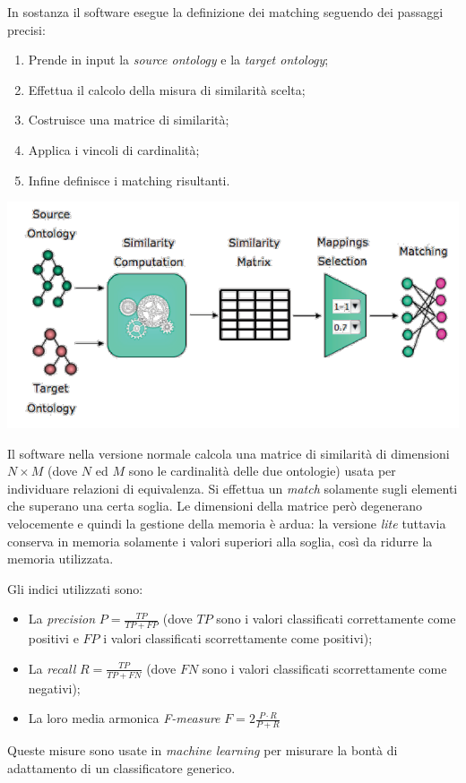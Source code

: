 \documentclass[11pt]{article}
\begin{document}
In sostanza il software esegue la definizione dei matching seguendo dei passaggi precisi:
\begin{enumerate}
\item Prende in input la \textit{source ontology} e la \textit{target ontology};
\item Effettua il calcolo della misura di similarità scelta;
\item Costruisce una matrice di similarità;
\item Applica i vincoli di cardinalità;
\item Infine definisce i matching risultanti.
\end{enumerate}
\begin{center}
\includegraphics[scale=0.7]{IMG6.png}
\end{center}
Il software nella versione normale calcola una matrice di similarità di dimensioni $N \times M$ (dove $N$ ed $M$ sono le cardinalità delle due ontologie) usata per individuare relazioni di equivalenza.
Si effettua un \textit{match} solamente sugli elementi che superano una certa soglia.
Le dimensioni della matrice però degenerano velocemente e quindi la gestione della memoria è ardua: la versione \textit{lite} tuttavia conserva in memoria solamente i valori superiori alla soglia, così da ridurre la memoria utilizzata.

Gli indici utilizzati sono:
\begin{itemize}
\item La \textit{precision} $P = \frac{TP}{TP+FP}$ (dove $TP$ sono i valori classificati correttamente come positivi e $FP$ i valori classificati scorrettamente come positivi);
\item La \textit{recall} $R = \frac{TP}{TP+FN}$ (dove $FN$ sono i valori classificati scorrettamente come negativi);
\item La loro media armonica \textit{F-measure} $F =2 \frac{P \cdot R}{P+R}$
\end{itemize}
Queste misure sono usate in \textit{machine learning} per misurare la bontà di adattamento di un classificatore generico. 
\end{document}
